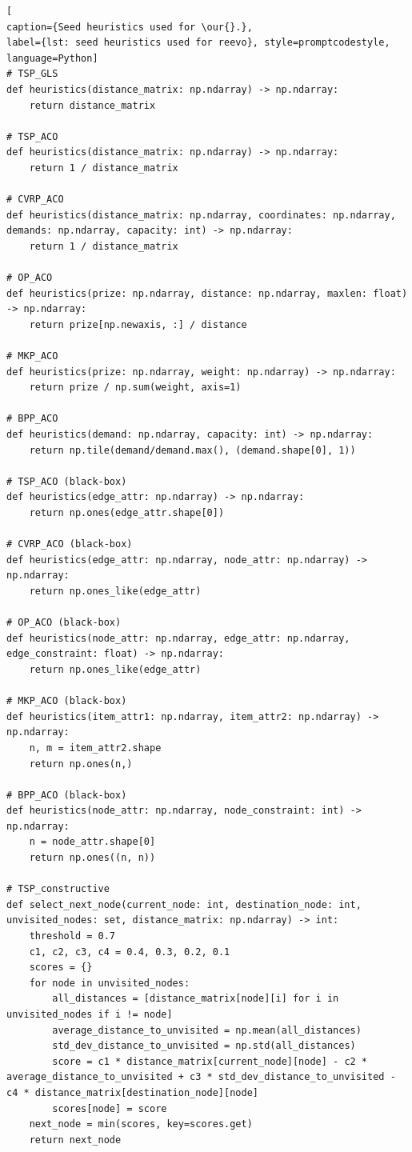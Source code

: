 \begin{lstlisting}[
caption={Seed heuristics used for \our{}.},
label={lst: seed heuristics used for reevo}, style=promptcodestyle, language=Python]
# TSP_GLS
def heuristics(distance_matrix: np.ndarray) -> np.ndarray:
    return distance_matrix

# TSP_ACO
def heuristics(distance_matrix: np.ndarray) -> np.ndarray:
    return 1 / distance_matrix

# CVRP_ACO
def heuristics(distance_matrix: np.ndarray, coordinates: np.ndarray, demands: np.ndarray, capacity: int) -> np.ndarray:
    return 1 / distance_matrix

# OP_ACO
def heuristics(prize: np.ndarray, distance: np.ndarray, maxlen: float) -> np.ndarray:
    return prize[np.newaxis, :] / distance

# MKP_ACO
def heuristics(prize: np.ndarray, weight: np.ndarray) -> np.ndarray:
    return prize / np.sum(weight, axis=1)

# BPP_ACO
def heuristics(demand: np.ndarray, capacity: int) -> np.ndarray:
    return np.tile(demand/demand.max(), (demand.shape[0], 1))

# TSP_ACO (black-box)
def heuristics(edge_attr: np.ndarray) -> np.ndarray:
    return np.ones(edge_attr.shape[0])

# CVRP_ACO (black-box)
def heuristics(edge_attr: np.ndarray, node_attr: np.ndarray) -> np.ndarray:
    return np.ones_like(edge_attr)

# OP_ACO (black-box)
def heuristics(node_attr: np.ndarray, edge_attr: np.ndarray, edge_constraint: float) -> np.ndarray:
    return np.ones_like(edge_attr)

# MKP_ACO (black-box)
def heuristics(item_attr1: np.ndarray, item_attr2: np.ndarray) -> np.ndarray:
    n, m = item_attr2.shape
    return np.ones(n,)

# BPP_ACO (black-box)
def heuristics(node_attr: np.ndarray, node_constraint: int) -> np.ndarray:
    n = node_attr.shape[0]
    return np.ones((n, n))

# TSP_constructive
def select_next_node(current_node: int, destination_node: int, unvisited_nodes: set, distance_matrix: np.ndarray) -> int:
    threshold = 0.7
    c1, c2, c3, c4 = 0.4, 0.3, 0.2, 0.1
    scores = {}
    for node in unvisited_nodes:
        all_distances = [distance_matrix[node][i] for i in unvisited_nodes if i != node]
        average_distance_to_unvisited = np.mean(all_distances)
        std_dev_distance_to_unvisited = np.std(all_distances)
        score = c1 * distance_matrix[current_node][node] - c2 * average_distance_to_unvisited + c3 * std_dev_distance_to_unvisited - c4 * distance_matrix[destination_node][node]
        scores[node] = score
    next_node = min(scores, key=scores.get)
    return next_node
\end{lstlisting}


